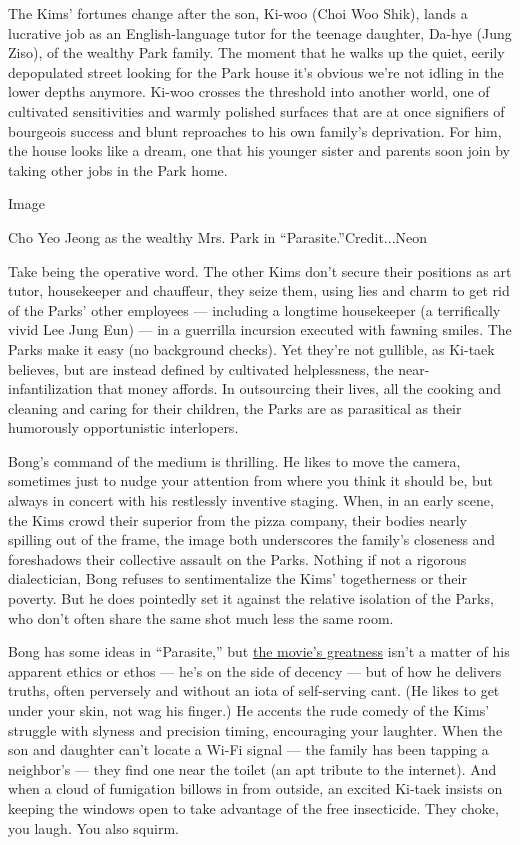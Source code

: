 The Kims' fortunes change after the son, Ki-woo (Choi Woo Shik), lands a
lucrative job as an English-language tutor for the teenage daughter,
Da-hye (Jung Ziso), of the wealthy Park family. The moment that he walks
up the quiet, eerily depopulated street looking for the Park house it's
obvious we're not idling in the lower depths anymore. Ki-woo crosses the
threshold into another world, one of cultivated sensitivities and warmly
polished surfaces that are at once signifiers of bourgeois success and
blunt reproaches to his own family's deprivation. For him, the house
looks like a dream, one that his younger sister and parents soon join by
taking other jobs in the Park home.

Image

Cho Yeo Jeong as the wealthy Mrs. Park in ``Parasite.''Credit...Neon

Take being the operative word. The other Kims don't secure their
positions as art tutor, housekeeper and chauffeur, they seize them,
using lies and charm to get rid of the Parks' other employees ---
including a longtime housekeeper (a terrifically vivid Lee Jung Eun) ---
in a guerrilla incursion executed with fawning smiles. The Parks make it
easy (no background checks). Yet they're not gullible, as Ki-taek
believes, but are instead defined by cultivated helplessness, the
near-infantilization that money affords. In outsourcing their lives, all
the cooking and cleaning and caring for their children, the Parks are as
parasitical as their humorously opportunistic interlopers.

Bong's command of the medium is thrilling. He likes to move the camera,
sometimes just to nudge your attention from where you think it should
be, but always in concert with his restlessly inventive staging. When,
in an early scene, the Kims crowd their superior from the pizza company,
their bodies nearly spilling out of the frame, the image both
underscores the family's closeness and foreshadows their collective
assault on the Parks. Nothing if not a rigorous dialectician, Bong
refuses to sentimentalize the Kims' togetherness or their poverty. But
he does pointedly set it against the relative isolation of the Parks,
who don't often share the same shot much less the same room.

Bong has some ideas in ``Parasite,'' but
\href{https://www.nytimes.com/2019/05/25/movies/cannes-film-festival-winners-parasite.html}{the
movie's greatness} isn't a matter of his apparent ethics or ethos ---
he's on the side of decency --- but of how he delivers truths, often
perversely and without an iota of self-serving cant. (He likes to get
under your skin, not wag his finger.) He accents the rude comedy of the
Kims' struggle with slyness and precision timing, encouraging your
laughter. When the son and daughter can't locate a Wi-Fi signal --- the
family has been tapping a neighbor's --- they find one near the toilet
(an apt tribute to the internet). And when a cloud of fumigation billows
in from outside, an excited Ki-taek insists on keeping the windows open
to take advantage of the free insecticide. They choke, you laugh. You
also squirm.

